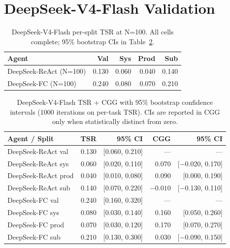 \documentclass[10pt]{article}
\begin{document}
\section{DeepSeek-V4-Flash Validation}
\label{app:deepseek-full}

\begin{table}[h]
    \centering
    \small
    \begin{tabular}{lrrrr}
        \toprule
        Agent & Val & Sys & Prod & Sub \\
        \midrule
        DeepSeek-ReAct (N=100) & 0.130 & 0.060 & 0.040 & 0.140 \\
        DeepSeek-FC (N=100)    & 0.240 & 0.080 & 0.070 & 0.210 \\
        \bottomrule
    \end{tabular}
    \caption{DeepSeek-V4-Flash per-split TSR at N=100. All cells complete; 95\% bootstrap CIs in Table~\ref{tab:deepseek-ci}.}
    \label{tab:deepseek-full}
\end{table}

\begin{table}[h]
    \centering
    \small
    \begin{tabular}{lrrrr}
        \toprule
        Agent / Split & TSR & 95\% CI & CGG & 95\% CI \\
        \midrule
        DeepSeek-ReAct val         & 0.130 & [0.060, 0.210] & ---  & --- \\
        DeepSeek-ReAct sys         & 0.060 & [0.020, 0.110] & 0.070 & [$-$0.020, 0.170] \\
        DeepSeek-ReAct prod        & 0.040 & [0.010, 0.080] & 0.090 & [0.000, 0.190] \\
        DeepSeek-ReAct sub         & 0.140 & [0.070, 0.220] & $-0.010$ & [$-$0.130, 0.110] \\
        \midrule
        DeepSeek-FC val            & 0.240 & [0.160, 0.320] & --- & --- \\
        DeepSeek-FC sys            & 0.080 & [0.030, 0.140] & 0.160 & [0.050, 0.260] \\
        DeepSeek-FC prod           & 0.070 & [0.030, 0.120] & 0.170 & [0.070, 0.270] \\
        DeepSeek-FC sub            & 0.210 & [0.130, 0.300] & 0.030 & [$-$0.090, 0.150] \\
        \bottomrule
    \end{tabular}
    \caption{DeepSeek-V4-Flash TSR + CGG with 95\% bootstrap confidence intervals (1000 iterations on per-task TSR). CIs are reported in CGG only when statistically distinct from zero.}
    \label{tab:deepseek-ci}
\end{table}
\end{document}
